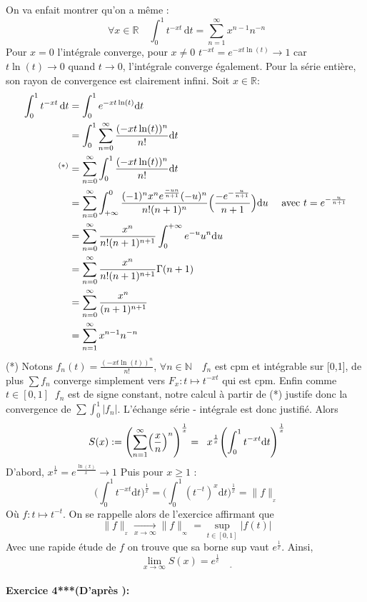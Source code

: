 \documentclass[letterpaper,10pt]{article}
\begin{document}
On va enfait montrer qu'on a même : \[\ \forall x \in \mathbb{R} \quad \int_0^1 t^{-xt}\,\mathrm{d}t = \sum_{n=1}^\infty x^{n-1}n^{-n} \]
Pour $x=0 $ l'intégrale converge, pour $x\neq0$  $t^{-xt} = e^{-xt\ln(t)} \to 1 $ car $t\ln(t) \to 0$ quand $t \to 0$, l'intégrale converge également. Pour la série entière, son rayon de convergence est clairement infini.
Soit  $x \in \mathbb{R}$:
\begin{align*} \int_0^1 t^{-xt}\,\mathrm{d}t  &= \int_0^1 e^{-xt\ln(t)} \mathrm{d}t \\ & = \int_0^1\sum_{n=0}^{\infty}\frac{(-xt\ln(t))^n}{n!} \mathrm{d}t  \\  ^{(*)} &= \sum_{n=0}^{\infty}\int_0^1\frac{(-xt\ln(t))^n}{n!} \mathrm{d}t  \\ & = \sum_{n=0}^{\infty}\int_{+\infty}^0\frac{(-1)^nx^ne^{\frac{-un}{n+1}}(-u)^n}{n!(n+1)^n} \Bigl(\frac{-e^{-\frac{u}{n+1}}}{n+1}\Bigr)\mathrm{d}u \quad \text{ avec } t=e^{-\frac{u}{n+1}} 
\\ & = 
\sum_{n=0}^{\infty}\frac{x^n}{n!(n+1)^{n+1}}\int_0^{+\infty} e^{-u}u^n\mathrm{d}u 
\\ & = 
\sum_{n=0}^{\infty}\frac{x^n}{n!(n+1)^{n+1}}\Gamma(n+1)
\\ & = \sum_{n=0}^{\infty}\frac{x^n}{(n+1)^{n+1}}
\\ & = \sum_{n=1}^{\infty}x^{n-1}n^{-n}
\end{align*}
(*) Notons $f_n(t) = \frac{(-xt\ln(t))^n}{n!}$, $\forall n \in \mathbb{N} \quad f_n$ est cpm et intégrable sur [0,1], de plus $\sum f_n$ converge simplement vers $F_x:t\mapsto t^{-xt}$ qui est cpm. Enfin comme $t \in [0,1] \;\; f_n$ est de signe constant, notre calcul à partir de (*) justife donc la convergence de $\sum\int_0^1|f_n|$. L'échange série - intégrale est donc justifié.
Alors \[\ S(x) := \Biggl( \sum_{n=1}^{\infty} \Bigl(\frac{x}{n}\Bigr)^n\Biggr)^{\frac{1}{x}} = \;\; x^{\frac{1}{x}}\Biggl(\int_0^1 t^{-xt} \mathrm{d}t\Biggr)^{\frac{1}{x}} \] D'abord, $x^{\frac{1}{x}} = e^{\frac{\ln(x)}{x}} \to 1$ Puis pour $x \geq 1$ : \[\ \Biggl(\int_0^1 t^{-xt} \mathrm{d}t\Biggr)^{\frac{1}{x}}  = \Biggl(\int_0^1 (t^{-t})^x \mathrm{d}t\Biggr)^{\frac{1}{x}} = \|f\|_{_x} \] Où $f: t \mapsto t^{-t}$. On se rappelle alors de l'exercice affirmant que \[\ \|f\|_{_x} \xrightarrow[x \to \infty]{} \|f\|_{_\infty} = \sup_{t\in [0,1]}|f(t)| \] Avec une rapide étude de $f$ on trouve que sa borne sup vaut $e^{\frac{1}{e}}$. Ainsi, \[\ \lim_{x \to \infty}S(x) = e^{\frac{1}{e}}\quad _{_\square} \] 


\paragraph{Exercice 4***(D'après \cite{igor}):}
\end{document}
